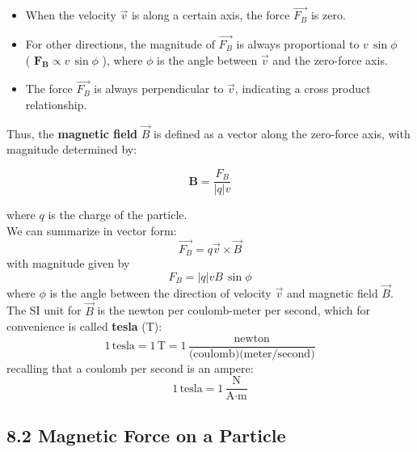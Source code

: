 \documentclass[12pt, a4paper]{article}
\begin{document}
		\begin{itemize}
			\item When the velocity $\vec{v}$ is along a certain axis, the force $\vec{F_B}$ is zero.  
			
			\item For other directions, the magnitude of $\vec{F_B}$ is always proportional to $v \, \sin \phi$ \\( $\mathbf{F_B} \propto v \, \sin \phi$ ), where $\phi$ is the angle between $\vec{v}$ and the zero-force axis.  
			
			\item The force $\vec{F_B}$ is always perpendicular to $\vec{v}$, indicating a cross product relationship. 
		\end{itemize}
	
		
		Thus, the \textbf{magnetic field} $\vec{B}$ is defined as a vector along the zero-force axis, with magnitude determined by:  
		
		\[
			\mathbf{B} = \frac{F_B}{|q| v}
		\]
		
		where $q$ is the charge of the particle.\\
		We can summarize in vector form:
		\[
			\vec{F_B} = q \vec{v} \times \vec{B}
			\tag{8-1}
		\]
		with magnitude given by
		\[
			F_B = |q| v B \, \sin \phi
			\tag{8-2}
		\]
		where $\phi$ is the angle between the direction of velocity $\vec{v}$ and magnetic field $\vec{B}$. \\
		The SI unit for $\vec{B}$ is the newton per coulomb-meter per second, which for convenience is called \textbf{tesla} (T):
		\[
			1 \, \text{tesla} = 1 \, \text{T} = 1 \, \frac{\text{newton}}{\text{(coulomb)(meter/second)}}
		\]
		recalling that a coulomb per second is an ampere:
		\[
			1 \, \text{tesla} = 1 \, \frac{\text{N}}{\text{A} \cdot \text{m}}
		\]
		
		
		
		\newpage
		
		\subsection*{8.2 Magnetic Force on a Particle}
		
\end{document}
